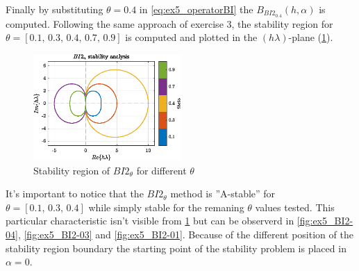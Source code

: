 \documentclass[11pt,a4paper,oneside]{article}
\begin{document}
Finally by substituting $\theta = 0.4$ in \cref{eq:ex5_operatorBI} the $B_{BI2_{0.4}}(h,\alpha)$ is computed.
Following the same approach of exercise 3, the stability region for $\theta = [0.1,\, 0.3,\, 0.4,\, 0.7,\, 0.9]$ is computed and plotted in the $(h\lambda)$-plane (\cref{fig:ex5_stabReg}).
\begin{figure}[htb]
    \centering
    \includegraphics*[width=0.5\textwidth, keepaspectratio]{ex5_stabReg.eps}
    \caption[]{\label{fig:ex5_stabReg} Stability region of $BI2_{\theta}$ for different $\theta$}
\end{figure}

It's important to notice that the $BI2_{\theta}$ method is ''A-stable'' for $\theta = [0.1,\, 0.3,\, 0.4]$ while simply stable for the remaning $\theta$ values tested.
This particular characteristic isn't visible from \cref{fig:ex5_stabReg} but can be observerd in \cref{fig:ex5_BI2-04}, \cref{fig:ex5_BI2-03} and \cref{fig:ex5_BI2-01}.
Because of the different position of the stability region boundary the starting point of the stability problem is placed in $\alpha = 0$.
\end{document}
